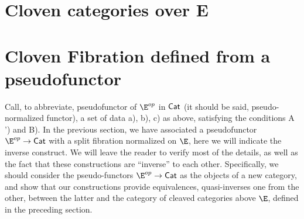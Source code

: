 \section{Cloven categories over E}

\section{Cloven Fibration defined from a pseudofunctor}

Call, to abbreviate, pseudofunctor of $\E^{op}$ in $\mathsf{Cat}$ (it should be said, pseudo-normalized functor), a set of data a), b), c) as above, satisfying the conditions A ') and B). 
In the previous section, we have associated a pseudofunctor $\E^{op} \to \Cat$ with a split fibration normalized on $\E$, here we will indicate the inverse construct. 
We will leave the reader to verify most of the details, as well as the fact that these constructions are ``inverse'' to each other. 
Specifically, we should consider the pseudo-functors $\E^{op} \to \Cat$ as the objects of a new category, and show that our constructions provide equivalences, quasi-inverses one from the other, between the latter and the category of cleaved categories above $\E$, defined in the preceding section.

